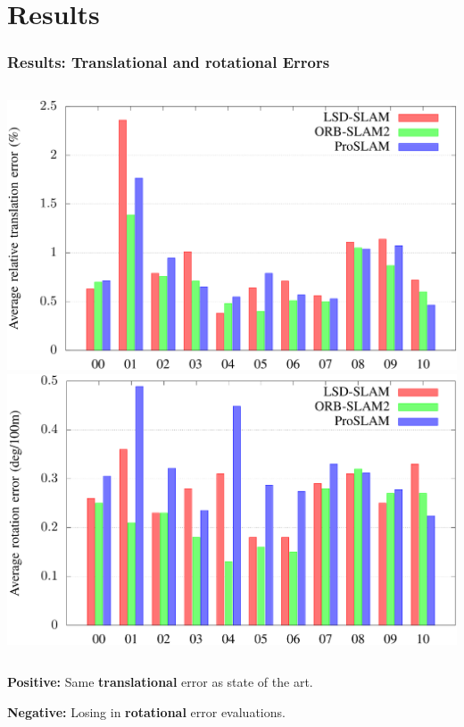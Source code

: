 \documentclass[16pt]{beamer}
\begin{document}
\section{ Results }
\begin{frame}
  \frametitle{Results:   Translational and rotational Errors}
  \begin{columns}
    \includegraphics[width=1\textwidth]{HDslam9}
    \includegraphics[width=1\textwidth]{HDslam10}
  \end{columns}

  \begin{block}{\centering\textbf{Positive:}}
    Same \textbf{translational} error as state of the art.
  \end{block}
  \begin{block}{\centering\textbf{Negative:}}
    Losing in \textbf{rotational} error evaluations.
  \end{block}
\end{frame}
\end{document}
